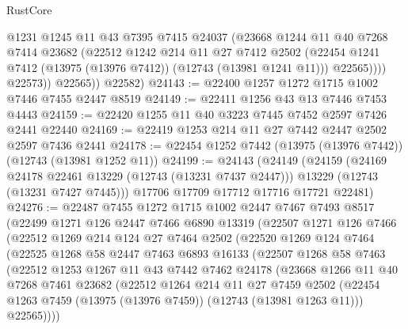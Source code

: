 \begin{lexlean}{RustCore}
\begin{coremodule}
                  @1231
                  @1245
                  @11
                  @43
                  @7395
                  @7415
                  @24037
                  (@23668
                    @1244
                    @11
                    @40
                    @7268
                    @7414
                    @23682
                    (@22512
                      @1242
                      @214
                      @11
                      @27
                      @7412
                      @2502
                      (@22454 @1241 @7412 (@13975 (@13976 @7412)) (@12743 (@13981 @1241 @11)))
                      @22565))))
              @22573))
          @22565))
      @22582)
@24143 := @22400 @1257 @1272 @1715 @1002 @7446 @7455 @2447 @8519
@24149 := @22411 @1256 @43 @13 @7446 @7453 @4443
@24159 := @22420 @1255 @11 @40 @3223 @7445 @7452 @2597 @7426 @2441 @22440
@24169 := @22419 @1253 @214 @11 @27 @7442 @2447 @2502 @2597 @7436 @2441
@24178 := @22454 @1252 @7442 (@13975 (@13976 @7442)) (@12743 (@13981 @1252 @11))
@24199 := @24143
    (@24149
      (@24159
        (@24169 @24178 @22461 @13229 (@12743 (@13231 @7437 @2447)))
        @13229
        (@12743 (@13231 @7427 @7445)))
      @17706
      @17709
      @17712
      @17716
      @17721
      @22481)
@24276 := @22487
    @7455
    @1272
    @1715
    @1002
    @2447
    @7467
    @7493
    @8517
    (@22499
      @1271
      @126
      @2447
      @7466
      @6890
      @13319
      (@22507
        @1271
        @126
        @7466
        (@22512
          @1269
          @214
          @124
          @27
          @7464
          @2502
          (@22520
            @1269
            @124
            @7464
            (@22525
              @1268
              @58
              @2447
              @7463
              @6893
              @16133
              (@22507
                @1268
                @58
                @7463
                (@22512
                  @1253
                  @1267
                  @11
                  @43
                  @7442
                  @7462
                  @24178
                  (@23668
                    @1266
                    @11
                    @40
                    @7268
                    @7461
                    @23682
                    (@22512
                      @1264
                      @214
                      @11
                      @27
                      @7459
                      @2502
                      (@22454 @1263 @7459 (@13975 (@13976 @7459)) (@12743 (@13981 @1263 @11)))
                      @22565))))

\end{coremodule}
\end{lexlean}
